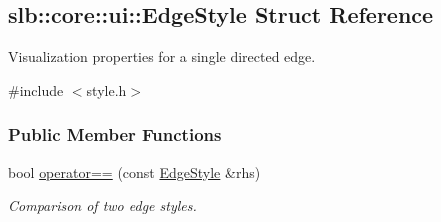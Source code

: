 \hypertarget{structslb_1_1core_1_1ui_1_1EdgeStyle}{}\subsection{slb\+:\+:core\+:\+:ui\+:\+:Edge\+Style Struct Reference}
\label{structslb_1_1core_1_1ui_1_1EdgeStyle}


Visualization properties for a single directed edge.  




{\ttfamily \#include $<$style.\+h$>$}

\subsubsection*{Public Member Functions}
\begin{DoxyCompactItemize}
\item 
bool \hyperlink{structslb_1_1core_1_1ui_1_1EdgeStyle_aff7b9edc83714c44d13ce1582471ff3a}{operator==} (const \hyperlink{structslb_1_1core_1_1ui_1_1EdgeStyle}{Edge\+Style} \&rhs)\hypertarget{structslb_1_1core_1_1ui_1_1EdgeStyle_aff7b9edc83714c44d13ce1582471ff3a}{}\label{structslb_1_1core_1_1ui_1_1EdgeStyle_aff7b9edc83714c44d13ce1582471ff3a}

\begin{DoxyCompactList}\small\item\em Comparison of two edge styles. \end{DoxyCompactList}\end{DoxyCompactItemize}
